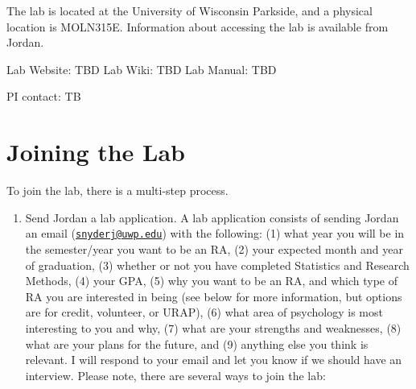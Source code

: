 \documentclass[
]{book}
\providecommand{\tightlist}{%
  \setlength{\itemsep}{0pt}\setlength{\parskip}{0pt}}
\begin{document}
The lab is located at the University of Wisconsin Parkside, and a physical location is MOLN315E. Information about accessing the lab is available from Jordan.

Lab Website: TBD
Lab Wiki: TBD
Lab Manual: TBD

PI contact: TB

\hypertarget{joining-the-lab}{%
\section{Joining the Lab}\label{joining-the-lab}}

To join the lab, there is a multi-step process.

\begin{enumerate}
\def\labelenumi{\arabic{enumi}.}
\tightlist
\item
  Send Jordan a lab application. A lab application consists of sending Jordan an email (\href{mailto:snyderj@uwp.edu}{\nolinkurl{snyderj@uwp.edu}}) with the following: (1) what year you will be in the semester/year you want to be an RA, (2) your expected month and year of graduation, (3) whether or not you have completed Statistics and Research Methods, (4) your GPA, (5) why you want to be an RA, and which type of RA you are interested in being (see below for more information, but options are for credit, volunteer, or URAP), (6) what area of psychology is most interesting to you and why, (7) what are your strengths and weaknesses, (8) what are your plans for the future, and (9) anything else you think is relevant. I will respond to your email and let you know if we should have an interview. Please note, there are several ways to join the lab:
\end{enumerate}
\end{document}
